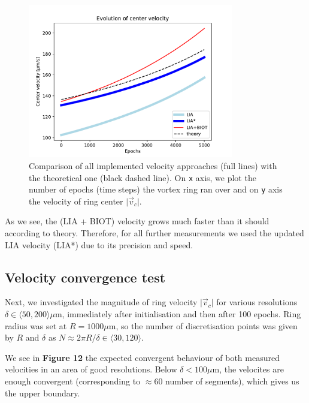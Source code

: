 \begin{figure}[h]
	\centering
	\includegraphics[width=0.8\textwidth]{graphics/results/vels_evolution}
	\caption{Comparison of all implemented velocity approaches (full lines) with the theoretical one (black dashed line). On \texttt{x} axis, we plot the number of epochs (time steps) the vortex ring ran over and on \texttt{y} axis the velocity of ring center $\vert \vec{v}_c \vert $.}
\end{figure}

As we see, the (LIA + BIOT) velocity grows much faster than it should according to theory. Therefore, for all further measurements we used the updated LIA velocity (LIA*) due to its precision and speed.

\subsection*{Velocity convergence test}

Next, we investigated the magnitude of ring velocity $\vert \vec{v}_c \vert $ for various resolutions $\delta \in \langle 50, 200 \rangle \mu\text{m}$, immediately after initialisation and then after 100 epochs. Ring radius was set at $R=1000\mu\text{m}$, so the number of discretisation points was given by $R$ and $\delta$ as $N \approx 2\pi R/ \delta \in \langle 30,120 \rangle$.

We see in \textbf{Figure 12} the expected convergent behaviour of both measured velocities in an area of good resolutions. Below $ \delta < 100 \mu\text{m}$, the velocites are enough convergent (corresponding to $\approx 60$ number of segments), which gives us the upper boundary.

